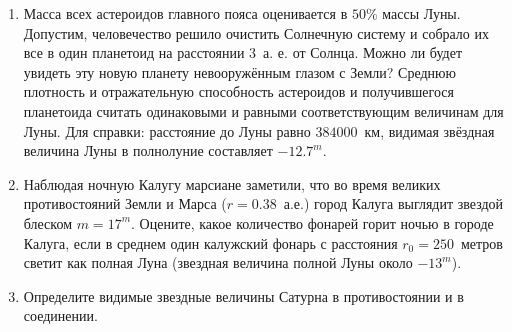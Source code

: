 \documentclass[12pt]{article}
\begin{document}
\begin{enumerate}
        \item Масса всех астероидов главного пояса оценивается в $50\%$ массы Луны. Допустим, человечество решило очистить Солнечную систему и собрало их все в один планетоид на расстоянии $3$~а. е. от Солнца. Можно ли будет увидеть эту новую планету невооружённым глазом с Земли? Среднюю плотность и отражательную способность астероидов и получившегося планетоида считать одинаковыми и равными соответствующим величинам для Луны. Для справки: расстояние до Луны равно $384 000$~км, видимая звёздная величина Луны в полнолуние составляет $-12.7^m$.
        \item Наблюдая ночную Калугу марсиане заметили, что во время великих противостояний Земли и Марса ($r=0.38$~а.е.) город Калуга выглядит звездой блеском $m=17^m$. Оцените, какое количество фонарей горит ночью в городе Калуга, если в среднем один калужский фонарь с расстояния $r_0=250$~метров светит как полная Луна (звездная величина полной Луны около $-13^m$).
        \item Определите видимые звездные величины Сатурна в противостоянии и в соединении.
    \end{enumerate}
\end{document}
